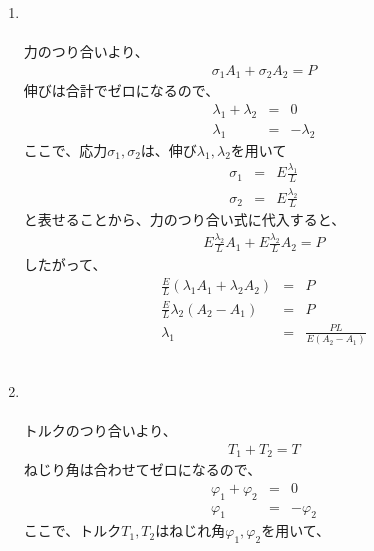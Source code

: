 \documentclass[a4paper]{jsarticle}
\begin{document}
\begin{enumerate}[(1)]
    \item {}\\
          \\
          力のつり合いより、
          \begin{eqnarray*}
              \sigma_1A_1+\sigma_2A_2=P
          \end{eqnarray*}
          伸びは合計でゼロになるので、
          \begin{eqnarray*}
              \lambda_1+\lambda_2&=&0\\
              \lambda_1&=&-\lambda_2
          \end{eqnarray*}
          ここで、応力$\sigma_1,\sigma_2$は、伸び$\lambda_1,\lambda_2$を用いて
          \begin{eqnarray*}
              \sigma_1&=&E\frac{\lambda_1}{L}\\
              \sigma_2&=&E\frac{\lambda_2}{L}
          \end{eqnarray*}
          と表せることから、力のつり合い式に代入すると、
          \begin{eqnarray*}
              E\frac{\lambda_2}{L}A_1+E\frac{\lambda_2}{L}A_2=P
          \end{eqnarray*}
          したがって、
          \begin{eqnarray*}
              \frac{E}{L}\left(\lambda_1A_1+\lambda_2A_2\right)&=&P\\
              \frac{E}{L}\lambda_2\left(A_2-A_1\right)&=&P\\
              \lambda_1&=&\frac{PL}{E\left(A_2-A_1\right)}
          \end{eqnarray*}\\
    \item {}\\
          \\
          トルクのつり合いより、
          \begin{eqnarray*}
              T_1+T_2=T
          \end{eqnarray*}
          ねじり角は合わせてゼロになるので、
          \begin{eqnarray*}
              \varphi_1+\varphi_2&=&0\\
              \varphi_1&=&-\varphi_2
          \end{eqnarray*}
          ここで、トルク$T_1,T_2$はねじれ角$\varphi_1,\varphi_2$を用いて、

\end{enumerate}
\end{document}
